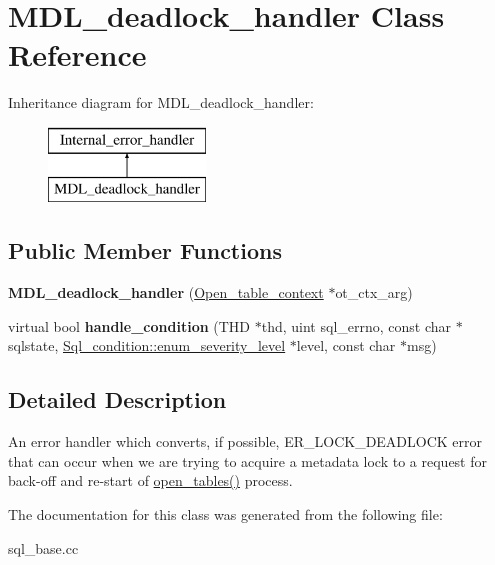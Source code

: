 \hypertarget{classMDL__deadlock__handler}{}\section{M\+D\+L\+\_\+deadlock\+\_\+handler Class Reference}
\label{classMDL__deadlock__handler}
Inheritance diagram for M\+D\+L\+\_\+deadlock\+\_\+handler\+:\begin{figure}[H]
\begin{center}
\leavevmode
\includegraphics[height=2.000000cm]{classMDL__deadlock__handler}
\end{center}
\end{figure}
\subsection*{Public Member Functions}
\begin{DoxyCompactItemize}
\item 
\mbox{\label{classMDL__deadlock__handler_a0d92a58dd6d26ebccc12eb1cb9f9d06e}} 
{\bfseries M\+D\+L\+\_\+deadlock\+\_\+handler} (\mbox{\hyperlink{classOpen__table__context}{Open\+\_\+table\+\_\+context}} $\ast$ot\+\_\+ctx\+\_\+arg)
\item 
\mbox{\label{classMDL__deadlock__handler_ac44691cb71986087203f7a97c5e4f0e8}} 
virtual bool {\bfseries handle\+\_\+condition} (T\+HD $\ast$thd, uint sql\+\_\+errno, const char $\ast$sqlstate, \mbox{\hyperlink{classSql__condition_ab0602581e19cddb609bfe10c44be4e83}{Sql\+\_\+condition\+::enum\+\_\+severity\+\_\+level}} $\ast$level, const char $\ast$msg)
\end{DoxyCompactItemize}


\subsection{Detailed Description}
An error handler which converts, if possible, E\+R\+\_\+\+L\+O\+C\+K\+\_\+\+D\+E\+A\+D\+L\+O\+CK error that can occur when we are trying to acquire a metadata lock to a request for back-\/off and re-\/start of \mbox{\hyperlink{group__Data__Dictionary_ga59e488af7a3f47be08fad22370de07c5}{open\+\_\+tables()}} process. 

The documentation for this class was generated from the following file\+:\begin{DoxyCompactItemize}
\item 
sql\+\_\+base.\+cc\end{DoxyCompactItemize}
